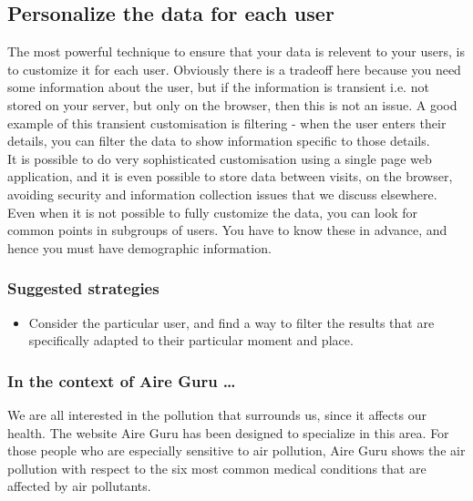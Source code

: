 \subsection{Personalize the data for each user}

The most powerful technique to ensure that your data is relevent to your users, is to customize it 
for each user. Obviously there is a tradeoff here because you need some information about the user,
but if the information is transient i.e. not stored on your server, but only on the browser, then this
is not an issue. A good example of this transient customisation is filtering - when the user enters
their details, you can filter the data to show information specific to those details.\\

It is possible to do very sophisticated customisation using a single page web application, and it is
even possible to store data between visits, on the browser, avoiding security and information collection issues that
we discuss elsewhere. \\

Even when it is not possible to fully customize the data, you can look for common points in subgroups of
users. You have to know these in advance, and hence you must have demographic information. \\

\subsubsection*{Suggested strategies} 

\begin{itemize}
  \item Consider the particular user, and find a way to filter the results that are specifically adapted to their particular moment and place.
\end{itemize}

\subsubsection*{In the context of Aire Guru \ldots}

We are all interested in the pollution that surrounds us, since it affects our health. The website
Aire Guru has been designed to specialize in this area. For those people who are especially sensitive to air pollution,
Aire Guru shows the air pollution with respect to the six most common medical conditions that
are affected by air pollutants.\\
 
